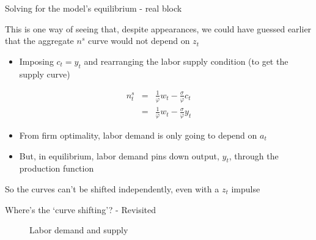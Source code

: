 

\begin{frame}{Solving for the model's equilibrium - real block}

This is one way of seeing that, despite appearances, we could have guessed earlier that the aggregate $n^{s}$ curve would not depend on $z_{t}$
\begin{itemize}
\item	Imposing $c_{t}=y_{t}$ and rearranging the labor supply condition (to get the supply curve)
\end{itemize}
\begin{eqnarray*}
n_{t}^{s} 	&=& \frac{1}{\varphi}w_{t} - \frac{\sigma}{\varphi}c_{t} \\
			&=& \frac{1}{\varphi}w_{t} - \frac{\sigma}{\varphi}y_{t}
\end{eqnarray*}
\begin{itemize}
\item	From firm optimality, labor demand is only going to depend on $a_{t}$
\item	But, in equilibrium, labor demand pins down output, $y_{t}$, through the production function
\end{itemize}

\vspace{2mm}
So the curves can't be shifted independently, even with a $z_{t}$ impulse
\end{frame}



\begin{frame}{Where's the `curve shifting'? - Revisited}

\begin{figure}[!htb]
\caption[Labor demand and supply]{\label{fig:lab_mkt_2} Labor demand and supply}
\end{figure}

\end{frame}

